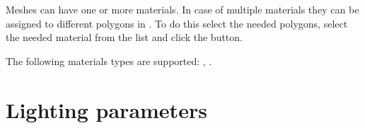 \documentclass[a4paper,12pt,oneside]{sphinxmanual}
\begin{document}
Meshes can have one or more materials. In case of multiple materials they can be assigned to different polygons in . To do this select the needed polygons, select the needed material from the list and click the  button.

The following materials types are supported: , .


\section{Lighting parameters}
\label{materials:id2}\label{materials:index-1}\label{materials:material-lighting-params}\begin{figure}[htbp]
\centering

\end{figure}
\end{document}
